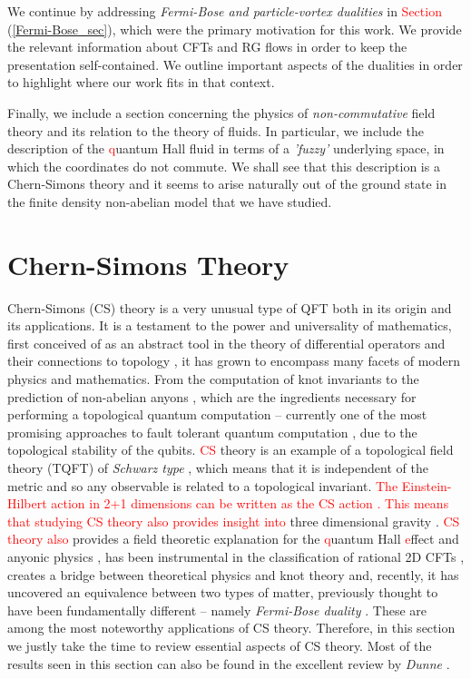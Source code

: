     We continue by addressing \textit{Fermi-Bose and particle-vortex dualities} in \textcolor{red}{Section} (\ref{Fermi-Bose_sec}), which were the primary motivation for this work. We provide the relevant information about CFTs and RG flows in order to keep the presentation self-contained. We outline important aspects of the dualities in order to highlight where our work fits in that context.

    Finally, we include a section concerning the physics of \textit{non-commutative} field theory and its relation to the theory of fluids. In particular, we include the description of the \textcolor{red}{q}uantum Hall fluid in terms of a \textit{'fuzzy'} underlying space, in which the coordinates do not commute. We shall see that this description is a Chern-Simons theory and it seems to arise naturally out of the ground state in the finite density non-abelian model that we have studied.

        \section{Chern-Simons Theory} \label{CS_sec}
    Chern-Simons (CS) theory is a very unusual type of QFT both in its origin and its applications. It is a testament to the power and universality of mathematics, first conceived of as an abstract tool in the theory of differential operators and their connections to topology \cite{Chern:1974ft}, it has grown to encompass many facets of modern physics and mathematics. From the computation of knot invariants \cite{Witten:1988hf} to the prediction of non-abelian anyons \cite{Moore:1991ks}, which are the ingredients necessary for performing a topological quantum computation \cite{RevModPhys.80.1083} -- currently one of the most promising approaches to fault tolerant quantum computation \cite{Kitaev:1997wr}, due to the topological stability of the qubits. \textcolor{red}{CS} theory is an example of a topological field theory (TQFT) of \textit{Schwarz type} \cite{Schwarz:2000ct}, which means that it is independent of the metric and so any observable is related to a topological invariant. \textcolor{red}{The Einstein-Hilbert action in 2+1 dimensions can be written as the CS action \cite{Achucarro:1987vz}. This means that studying CS theory also provides insight into} three dimensional gravity \cite{Carlip:2005zn, Deser:1982vy, Witten:2007kt}. \textcolor{red}{CS theory also} provides a field theoretic explanation for the \textcolor{red}{q}uantum Hall \textcolor{red}{e}ffect and anyonic physics \cite{Zee, Tong:2016kpv}, has been instrumental in the classification of rational 2D CFTs \cite{Moore:1989yh}, creates a bridge between theoretical physics and knot theory \cite{Witten:1988hf} and, recently, it has uncovered an equivalence between two types of matter, previously thought to have been fundamentally different -- namely \textit{Fermi-Bose duality} \cite{Aharony:2015mjs} \cite{Aharony:2012nh, Giombi:2011kc, Aharony:2011jz, Giveon:2008zn}. These are among the most noteworthy applications of CS theory. Therefore, in this section we justly take the time to review essential aspects of CS theory. Most of the results seen in this section can also be found in the excellent review by \textit{Dunne} \cite{Dunne:1998qy}.

